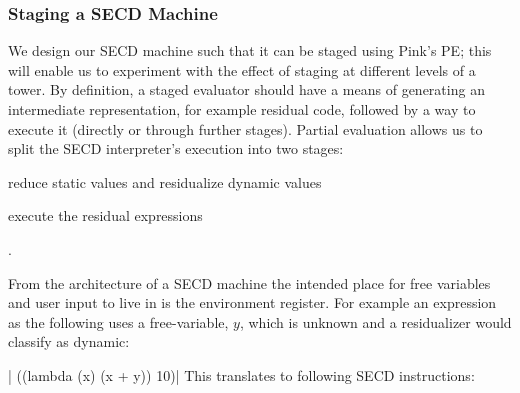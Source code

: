 \documentclass[a4paper,12pt,twoside,openright]{report}
\theoremstyle{definition}
\begin{document}
\subsubsection{Staging a SECD Machine}\label{subsec:secd_staged}

We design our SECD machine such that it can be staged using Pink's PE; this will enable us to experiment with the effect of staging at different levels of a tower. By definition, a staged evaluator should have a means of generating an intermediate representation, for example residual code, followed by a way to execute it (directly or through further stages). Partial evaluation allows us to split the SECD interpreter's execution into two stages:
\begin{enumerate*}[label=(\arabic*)]
    \item reduce static values and residualize dynamic values
    \item execute the residual expressions
\end{enumerate*}.

From the architecture of a SECD machine the intended place for free variables and user input to live in is the environment register. For example an expression as the following uses a free-variable, $y$, which is unknown and a residualizer would classify as dynamic:

|    ((lambda (x) (x + y)) 10)|
This translates to following SECD instructions:
\end{document}
